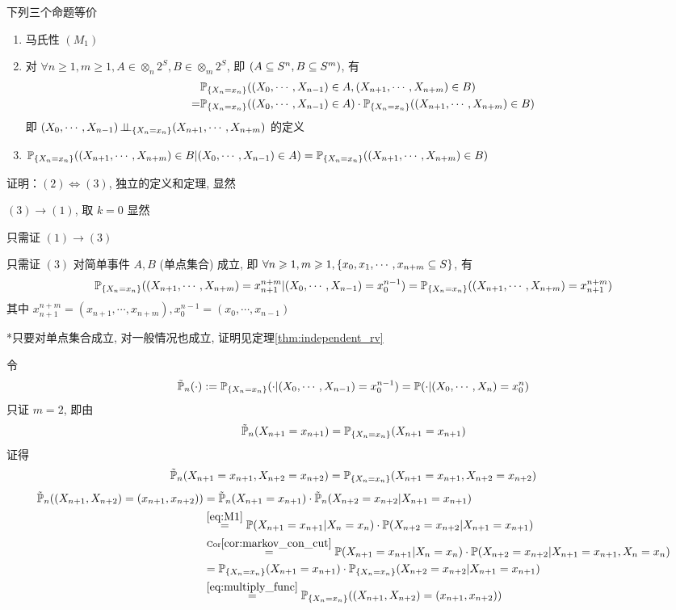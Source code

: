 \begin{property}[马氏性的等价条件]\label{prt:markov_equiv_condition}
下列三个命题等价
\begin{enumerate}
    \item 马氏性 $(M_1)$
    \item 对 $\forall n\geq 1,m\geq 1,A\in \otimes_n 2^S,B\in \otimes_m 2^S$, 即 $(A\subseteq S^n,B\subseteq S^m)$, 有
    \begin{equation}
    \begin{aligned}
        &\mathbb{P}_{\{X_n=x_n\}}((X_0,\cdots,X_{n-1})\in A,(X_{n+1},\cdots,X_{n+m})\in B)\\
        =&\mathbb{P}_{\{X_n=x_n\}}((X_0,\cdots,X_{n-1})\in A)\cdot \mathbb{P}_{\{X_n=x_n\}}((X_{n+1},\cdots,X_{n+m})\in B)
    \end{aligned}
    \label{eq:markov_equiv_condition_M2}
    \end{equation}
    即 $(X_0,\cdots,X_{n-1})\operatorname{\perp\!\!\!\perp}_{\{X_n=x_n\}}(X_{n+1},\cdots,X_{n+m})$ 的定义
    \item $\mathbb{P}_{\{X_n=x_n\}}((X_{n+1},\cdots,X_{n+m})\in B|(X_0,\cdots,X_{n-1})\in A)=\mathbb{P}_{\{X_n=x_n\}}((X_{n+1},\cdots,X_{n+m})\in B)$
\end{enumerate}
\end{property}

证明：$(2)\Leftrightarrow (3)$, 独立的定义和定理, 显然

$(3)\rightarrow (1)$, 取 $k=0$ 显然

只需证 $(1)\rightarrow (3)$

只需证 $(3)$ 对简单事件 $A,B$ (单点集合) 成立, 即 $\forall n\geqslant 1,m\geqslant 1, \{x_0,x_1,\cdots,x_{n+m}\subseteq S\}$, 有
\[
\mathbb{P}_{\{X_n=x_n\}}((X_{n+1},\cdots,X_{n+m})=x_{n+1}^{n+m}|(X_0,\cdots,X_{n-1})=x_0^{n-1})=\mathbb{P}_{\{X_n=x_n\}}((X_{n+1},\cdots,X_{n+m})=x_{n+1}^{n+m})
\]
其中 $x_{n+1}^{n+m}=(x_{n+1},\cdots,x_{n+m}),x_{0}^{n-1}=(x_0,\cdots,x_{n-1})$

*只要对单点集合成立, 对一般情况也成立, 证明见定理\ref{thm:independent_rv}

令
\[
\tilde{\mathbb{P}}_n(\cdot):=\mathbb{P}_{\{X_n=x_n\}}(\cdot|(X_0,\cdots,X_{n-1})=x_0^{n-1})=\mathbb{P}(\cdot|(X_0,\cdots,X_{n})=x_0^{n})
\]
只证 $m=2$, 即由
\[\tilde{\mathbb{P}}_n(X_{n+1}=x_{n+1})=\mathbb{P}_{\{X_n=x_n\}}(X_{n+1}=x_{n+1})\] 
证得
\[\tilde{\mathbb{P}}_n(X_{n+1}=x_{n+1}, X_{n+2}=x_{n+2})=\mathbb{P}_{\{X_n=x_n\}}(X_{n+1}=x_{n+1}, X_{n+2}=x_{n+2})\]
\[
\begin{aligned}
    \tilde{\mathbb{P}}_n((X_{n+1},X_{n+2})=(x_{n+1},x_{n+2}))&=\tilde{\mathbb{P}}_n(X_{n+1}=x_{n+1})\cdot \tilde{\mathbb{P}}_n(X_{n+2}=x_{n+2}|X_{n+1}=x_{n+1})\\
    &\overset{\eqref{eq:M1}}{=}\mathbb{P}(X_{n+1}=x_{n+1}|X_n=x_n)\cdot \mathbb{P}(X_{n+2}=x_{n+2}|X_{n+1}=x_{n+1})\\
    &\overset{\text{Cor}\eqref{cor:markov_con_cut}}{=}\mathbb{P}(X_{n+1}=x_{n+1}|X_n=x_n)\cdot \mathbb{P}(X_{n+2}=x_{n+2}|X_{n+1}=x_{n+1},X_n=x_n)\\
    &=\mathbb{P}_{\{X_n=x_n\}}(X_{n+1}=x_{n+1})\cdot \mathbb{P}_{\{X_n=x_n\}}(X_{n+2}=x_{n+2}|X_{n+1}=x_{n+1})\\
    &\overset{\eqref{eq:multiply_func}}{=}\mathbb{P}_{\{X_n=x_n\}}((X_{n+1},X_{n+2})=(x_{n+1},x_{n+2}))
\end{aligned}
\]

